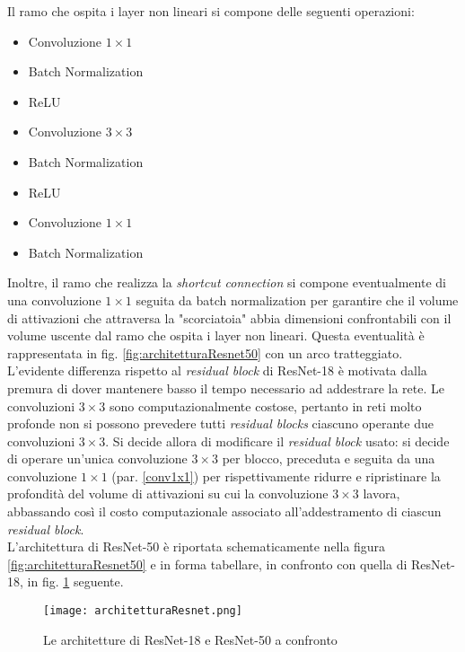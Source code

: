 Il ramo che ospita i layer non lineari si compone delle seguenti operazioni:

\begin{itemize}
\item Convoluzione $1\times 1$
\item Batch Normalization
\item ReLU
\item Convoluzione $3\times 3$
\item Batch Normalization
\item ReLU
\item Convoluzione $1\times 1$
\item Batch Normalization
\end{itemize}

Inoltre, il ramo che realizza la \textit{shortcut connection} si compone eventualmente di una convoluzione $1\times 1$ seguita da batch normalization per garantire che il volume di attivazioni che attraversa la "scorciatoia" abbia dimensioni confrontabili con il volume uscente dal ramo che ospita i layer non lineari. Questa eventualità è rappresentata in fig. \ref{fig:architetturaResnet50} con un arco tratteggiato.\\

L'evidente differenza rispetto al \textit{residual block} di ResNet-18 è motivata dalla premura di dover mantenere basso il tempo necessario ad addestrare la rete. Le convoluzioni $3\times 3$ sono computazionalmente costose, pertanto in reti molto profonde non si possono prevedere tutti \textit{residual blocks} ciascuno operante due convoluzioni $3\times 3$. Si decide allora di modificare il \textit{residual block} usato: si decide di operare un'unica convoluzione $3\times 3$ per blocco, preceduta e seguita da una convoluzione $1\times 1$ (par. \ref{conv1x1}) per rispettivamente ridurre e ripristinare la profondità del volume di attivazioni su cui la convoluzione $3\times 3$ lavora, abbassando così il costo computazionale associato all'addestramento di ciascun \textit{residual block}.\\

L'architettura di ResNet-50 è riportata schematicamente nella figura \ref{fig:architetturaResnet50} e in forma tabellare, in confronto con quella di ResNet-18, in fig. \ref{fig:confrontoResnet} seguente.

\begin{figure}[h!]
\centering
\texttt{[image: architetturaResnet.png]}
\caption{Le architetture di ResNet-18 e ResNet-50 a confronto}
\label{fig:confrontoResnet}
\end{figure}

